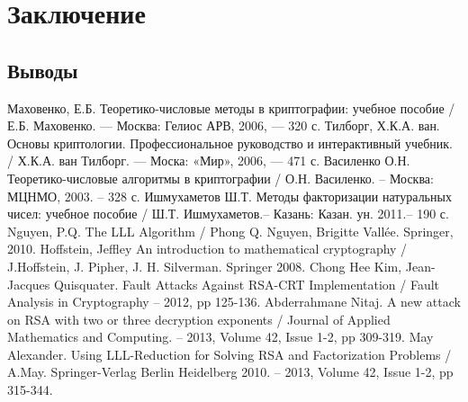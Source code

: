 \newpage
\chapter{Заключение}

\section{Выводы}

\newpage
\begin{thebibliography}{@@@@}	
		Маховенко, Е.Б. Теоретико-числовые методы в криптографии: учебное пособие / Е.Б. Маховенко. — Москва: Гелиос АРВ, 2006, — 320 с.
		Тилборг, Х.К.А. ван. Основы криптологии. Профессиональное руководство и интерактивный учебник. / Х.К.А. ван Тилборг. — Моска: «Мир», 2006,
		— 471 с.
		Василенко О.Н. Теоретико-числовые алгоритмы в криптографии / О.Н. Василенко. – Москва: МЦНМО, 2003. – 328 с.
		Ишмухаметов Ш.Т. Методы факторизации натуральных чисел: учебное пособие / Ш.Т. Ишмухаметов.– Казань: Казан. ун. 2011.– 190 с.
		Nguyen, P.Q. The LLL Algorithm / Phong Q. Nguyen, Brigitte Vallée. Springer, 2010.
		Hoffstein, Jeffley An introduction to mathematical cryptography / J.Hoffstein, J. Pipher, J. H. Silverman. Springer 2008.
		Chong Hee Kim, Jean-Jacques Quisquater. Fault Attacks Against RSA-CRT Implementation / Fault Analysis in Cryptography – 2012, pp 125-136.
		Abderrahmane Nitaj. A new attack on RSA with two or three decryption exponents / Journal of Applied Mathematics and Computing. –
		2013, Volume 42, Issue 1-2, pp 309-319.	
		May Alexander. Using LLL-Reduction for Solving RSA and Factorization Problems / A.May. Springer-Verlag Berlin Heidelberg 2010. –
		2013, Volume 42, Issue 1-2, pp 315-344.	
	\end{thebibliography}